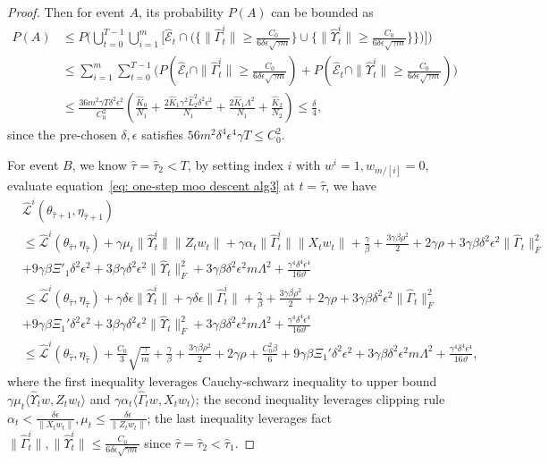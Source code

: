 \documentclass[twoside]{article} %
\def\eqref#1{equation~\ref{#1}}
\theoremstyle{plain}
\theoremstyle{definition}
\theoremstyle{remark}
\newcommand{\HGamma}{\hat{\Gamma}}
\newcommand{\HUpsilon}{\hat{\Upsilon}}
\newcommand{\hL}{\hat{L}}
\newcommand{\htau}{\hat{\tau}}
\newcommand{\fhL}{\hat{\mathcal{L}}}
\newcommand{\calhatE}{\mathcal{\hat{E}}}
\begin{document}
\begin{proof}
Then for event $A$, its probability $P(A)$ can be bounded as
\begin{align}
    P(A)&\leq P\Big(\bigcup_{t=0}^{T-1} \bigcup_{i=1}^m\Big[\calhatE_t \cap\big(\{\|\HGamma_t^i\| \geq \frac{C_0}{6\delta\epsilon\sqrt{\gamma m}}\} \cup\{\|\HUpsilon_t^i\| \geq \frac{C_0}{6\delta\epsilon\sqrt{\gamma m}}\}\}\big)\Big]\Big)\nonumber\\
    &\leq \sum_{i=1}^{m}\sum_{t=0}^{T-1}\big( P(\calhatE_t\cap \|\HGamma_{t}^i\|\geq \frac{C_0}{6\delta\epsilon\sqrt{\gamma   m}})+P(\calhatE_t\cap \|\HUpsilon_t^i\|\geq \frac{C_0}{6\delta\epsilon\sqrt{\gamma m}})\big)\nonumber\\
    &\leq \frac{36m^2\gamma T\delta^2\epsilon^2}{{C_0^2}}(\frac{\hat{K}_0}{N_1}+\frac{2\hat{K}_1\gamma^2\hL_2^2\delta^2\epsilon^2}{N_1}+\frac{2\hat{K}_1\Lambda^2}{N_1}+\frac{\hat{K}_2}{N_2})\leq \frac{\delta}{4},
\end{align}
since the pre-chosen $\delta,\epsilon$ satisfies ${56m^2\delta^4\epsilon^4\gamma T\leq{C_0^2}}$.

For event $B$, we know $\htau=\htau_2<T$, by setting index $i$ with  $w^i=1, w_{m/[i]}=0$, evaluate \eqref{eq: one-step moo descent alg3} at $t=\htau$,
we have
\begin{align}
&\fhL^i(\theta_{\htau+1},\eta_{\htau+1})\nonumber\\
&\leq \fhL^i(\theta_{\htau},\eta_{\htau}) +\gamma \mu_t\|\HUpsilon_t^i\|\| Z_tw_t\|+\gamma\alpha_t\| \HGamma_t^i\|\|X_tw_t\|+\frac{\gamma}{\beta}+\frac{3\gamma\beta\rho^2}{2}+2\gamma\rho+ 3\gamma\beta\delta^2\epsilon^2\|\HGamma_t\|_F^2\nonumber\\
&+9\gamma\beta\Xi'_1\delta^2\epsilon^2+3\beta\gamma\delta^2\epsilon^2\|\HUpsilon_t\|_F^2+3\gamma\beta\delta^2\epsilon^2m\Lambda^2+\frac{\gamma^4\delta^4\epsilon^4}{16\vartheta}\nonumber\\
&\leq \fhL^i(\theta_{\htau},\eta_{\htau})+\gamma \delta\epsilon\|\HUpsilon_t^i\|+\gamma\delta\epsilon\|\HGamma_t^i\|+\frac{\gamma}{\beta}+\frac{3\gamma\beta\rho^2}{2}+2\gamma\rho+ 3\gamma\beta\delta^2\epsilon^2\|\HGamma_t\|_F^2\nonumber\\
&+9\gamma\beta\Xi_1'\delta^2\epsilon^2+3\beta\gamma\delta^2\epsilon^2\|\HUpsilon_t\|_F^2+3\gamma\beta\delta^2\epsilon^2m\Lambda^2+\frac{\gamma^4\delta^4\epsilon^4}{16\vartheta}\nonumber\\
&\leq \fhL^i(\theta_{\htau},\eta_{\htau})+\frac{C_0}{3}\sqrt{\frac{\gamma}{m}}+\frac{\gamma}{\beta}+\frac{3\gamma\beta\rho^2}{2}+2\gamma\rho+\frac{C_0^2\beta}{6}+9\gamma\beta\Xi_1'\delta^2\epsilon^2+3\gamma\beta\delta^2\epsilon^2m\Lambda^2+\frac{\gamma^4\delta^4\epsilon^4}{16\vartheta},
\end{align}
where the first inequality leverages Cauchy-schwarz inequality to upper bound $\gamma\mu_t\langle\HUpsilon_tw,Z_tw_t\rangle$ and $\gamma\alpha_t\langle\HGamma_tw,X_tw_t \rangle$; the second inequality leverages clipping rule $\alpha_t<\frac{\delta\epsilon}{\|X_tw_t\|},\mu_t\leq \frac{\delta\epsilon}{\|Z_tw_t\|}$; the last inequality leverages fact $\|\HGamma_t^i\|,\|\HUpsilon_t^i\|\leq \frac{C_0}{6\delta\epsilon\sqrt{\gamma m}}$ since $\htau=\htau_2<\htau_1$.


\end{proof}
\end{document}
